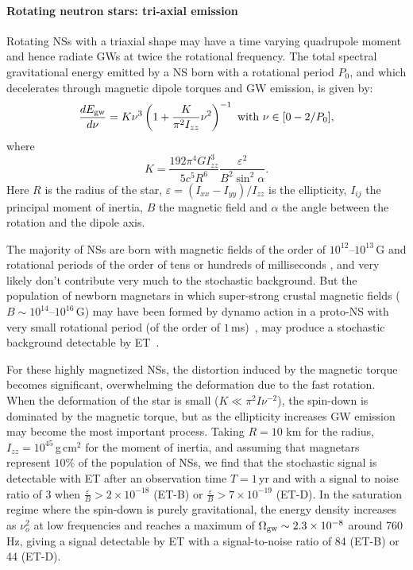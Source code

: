 \paragraph{Rotating neutron stars: tri-axial emission}
Rotating NSs with a triaxial shape may have a time varying
quadrupole moment and hence radiate GWs at twice the rotational
frequency.
The total spectral gravitational energy emitted by a NS born with a rotational period $P_0$, and
which decelerates through magnetic dipole torques and GW emission, is given by:
\begin{equation}
\frac{dE_{\rm gw}}{d \nu}=K \nu^3 \left(1+\frac{K}{\pi^2 I_{zz}} \nu^2\right)^{-1} \text{ with } \nu \in \lbrack 0-2/P_0 \rbrack,
\label{eq-Enj_pulsar}
\end{equation}
where
\begin{equation}
K = \frac{192 \pi^4 G I_{zz}^3}{5 c^5 R^6} \frac{\varepsilon^2}{B^2\sin^2 \alpha}.
\label{eq-K_pulsar}
\end{equation}
Here $R$ is the radius of the star, $\varepsilon=(I_{xx}-I_{yy})/I_{zz}$ is the 
ellipticity, $I_{ij}$ the principal moment of inertia, $B$ the magnetic field and 
$\alpha$ the angle between the rotation and the dipole axis.

The majority of NSs are born with magnetic fields of the order of $10^{12}$--$10^{13}$\,G and rotational periods of the order of tens or hundreds of milliseconds \cite{Regimbau:2000,Faucher:2006,Soria:2008,2011arXiv1103.1856G}, and very likely don't contribute very much to the stochastic background. But the population of newborn magnetars in which super-strong crustal magnetic fields  ($B \sim 10^{14}$--$10^{16}$\,G) may have been formed by dynamo action in a proto-NS with very small rotational period (of the order of $1\,$ms)~\cite{Duncan:1992,Thompson:1993hn}, may produce a stochastic background detectable by ET~\cite{Regimbau:2006a}.

For these highly magnetized NSs, the distortion induced by the magnetic torque becomes significant, overwhelming the deformation due to the fast rotation. When the deformation of the star is small ($K\ll\pi^2 I \nu^{-2}$), the spin-down is dominated by the magnetic torque, but as the ellipticity increases GW emission may become the most important process. 
Taking $R=10$ km for the radius, $I_{zz}= 10^{45}$\,g\,cm$^2$ for the moment of inertia, and assuming that magnetars represent $10\%$ of the population of NSs, %
we find that the stochastic signal is detectable with ET after an observation time $T=1$\,yr and with a signal to noise ratio of 3 when $\frac{\varepsilon}{B}>2 \times 10^{-18}$ (ET-B) or $\frac{\varepsilon}{B}>7 \times 10^{-19}$ (ET-D). In the saturation regime where the spin-down is purely gravitational, the energy density increases as $\nu_o^2$ at low frequencies and reaches a maximum of $\Omega_{\rm gw}
\sim 2.3 \times 10^{-8}$ around 760\,Hz, giving a signal detectable by ET with a signal-to-noise ratio of 84 (ET-B) or 44 (ET-D).

